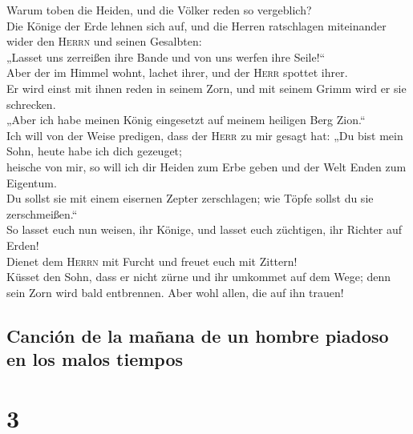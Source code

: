  Warum toben die Heiden, und die Völker reden so
vergeblich?\\
 Die Könige der Erde lehnen sich auf, und die Herren
ratschlagen miteinander wider den \textsc{Herrn} und seinen Gesalbten:\\
 „Lasset uns zerreißen ihre Bande und von uns werfen ihre
Seile!{}``\\
 Aber der im Himmel wohnt, lachet ihrer, und der
\textsc{Herr} spottet ihrer.\\
 Er wird einst mit ihnen reden in seinem Zorn, und mit
seinem Grimm wird er sie schrecken.\\
 „Aber ich habe meinen König eingesetzt auf meinem
heiligen Berg Zion.``\\
 Ich will von der Weise predigen, dass der \textsc{Herr}
zu mir gesagt hat: „Du bist mein Sohn, heute habe ich dich gezeuget;\\
 heische von mir, so will ich dir Heiden zum Erbe geben
und der Welt Enden zum Eigentum.\\
 Du sollst sie mit einem eisernen Zepter zerschlagen; wie
Töpfe sollst du sie zerschmeißen.``\\
 So lasset euch nun weisen, ihr Könige, und lasset euch
züchtigen, ihr Richter auf Erden!\\
 Dienet dem \textsc{Herrn} mit Furcht und freuet euch mit
Zittern!\\
 Küsset den Sohn, dass er nicht zürne und ihr umkommet
auf dem Wege; denn sein Zorn wird bald entbrennen. Aber wohl allen, die
auf ihn trauen!

\hypertarget{canciuxf3n-de-la-mauxf1ana-de-un-hombre-piadoso-en-los-malos-tiempos}{%
\subsection{Canción de la mañana de un hombre piadoso en los malos
tiempos}\label{canciuxf3n-de-la-mauxf1ana-de-un-hombre-piadoso-en-los-malos-tiempos}}

\hypertarget{section-2}{%
\section{3}\label{section-2}}

